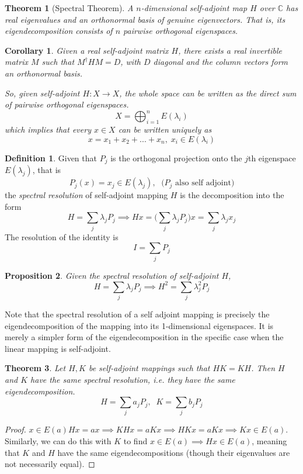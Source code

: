 \documentclass{article}
\newtheorem{theorem}{Theorem}[section]
\newtheorem{proposition}[theorem]{Proposition}
\newtheorem{corollary}{Corollary}[theorem]
\theoremstyle{remark}
\theoremstyle{definition}
\newtheorem{definition}{Definition}[section]
\begin{document}
    \begin{theorem}[Spectral Theorem]
    A $n$-dimensional self-adjoint map $H$ over $\mathbb{C}$ has real eigenvalues and an orthonormal basis of genuine eigenvectors. That is, its eigendecomposition consists of $n$ pairwise orthogonal eigenspaces. 
    \end{theorem}

    \begin{corollary}
    Given a real self-adjoint matrix $H$, there exists a real invertible matrix $M$ such that $M^\dagger H M = D$, with $D$ diagonal and the column vectors form an orthonormal basis.

    So, given self-adjoint $H: X \longrightarrow X$, the whole space can be written as the direct sum of pairwise orthogonal eigenspaces. 
    \[X = \bigoplus_{i=1}^n E(\lambda_i)\]
    which implies that every $x \in X$ can be written uniquely as 
    \[x = x_1 + x_2 + ... + x_n, \; x_i \in E(\lambda_i) \]
    \end{corollary}

    \begin{definition}
    Given that $P_j$ is the orthogonal projection onto the $j$th eigenspace $E(\lambda_j)$, that is
    \[P_j (x) = x_j \in E(\lambda_j), \; \text{ ($P_j$ also self adjoint)}\]
    the \textit{spectral resolution} of self-adjoint mapping $H$ is the decomposition into the form 
    \[H = \sum_j \lambda_j P_j \implies H x = \bigg( \sum_j \lambda_j P_j \bigg) x = \sum_j \lambda_j x_j\]
    The resolution of the identity is
    \[I = \sum_j P_j\]
    \end{definition}

    \begin{proposition}
    Given the spectral resolution of self-adjoint $H$, 
    \[H  = \sum_j \lambda_j P_j \implies H^2 = \sum_j \lambda_j^2 P_j\]
    \end{proposition}

    Note that the spectral resolution of a self adjoint mapping is precisely the eigendecomposition of the mapping into its 1-dimensional eigenspaces. It is merely a simpler form of the eigendecomposition in the specific case when the linear mapping is self-adjoint. 

    \begin{theorem}
    Let $H, K$ be self-adjoint mappings such that $H K = K H$. Then $H$ and $K$ have the same spectral resolution, i.e. they have the same eigendecomposition. 
    \[H = \sum_j a_j P_j, \; \; K = \sum_j b_j P_j\]
    \end{theorem}
    \begin{proof}
    $ x \in E(a) H x = a x \implies K H x = a K x \implies H K x = a K x \implies K x \in E(a)$. Similarly, we can do this with $K$ to find $x \in E(a) \implies H x \in E(a)$, meaning that $K$ and $H$ have the same eigendecompositions (though their eigenvalues are not necessarily equal). 
    \end{proof}
\end{document}
